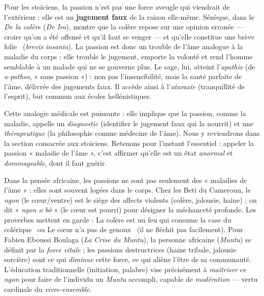 \documentclass[11pt]{article}
\begin{document}
\begin{propriete}
Pour les stoïciens, la passion n'est pas une force aveugle qui viendrait de l'extérieur : elle est un \textbf{jugement faux} de la raison elle-même. Sénèque, dans le \emph{De la colère} (\emph{De Ira}), montre que la colère repose sur une opinion erronée — croire qu'on a été offensé et qu'il faut se venger — et qu'elle constitue une \guillemotleft brève folie \guillemotright\ (\emph{brevis insania}). La passion est donc un trouble de l'âme analogue à la maladie du corps : elle trouble le jugement, emporte la volonté et rend l'homme semblable à un malade qui ne se gouverne plus. Le sage, lui, atteint l'\emph{apathie} (de \emph{a-pathos}, « sans passion ») : non pas l'insensibilité, mais la santé parfaite de l'âme, délivrée des jugements faux. Il accède ainsi à l'\emph{ataraxie} (tranquillité de l'esprit), but commun aux écoles hellénistiques.
\end{propriete}

Cette analogie médicale est puissante : elle implique que la passion, comme la maladie, appelle un \emph{diagnostic} (identifier le jugement faux qui la nourrit) et une \emph{thérapeutique} (la philosophie comme médecine de l'âme). Nous y reviendrons dans la section consacrée aux stoïciens. Retenons pour l'instant l'essentiel : appeler la passion « maladie de l'âme », c'est affirmer qu'elle est un état \emph{anormal} et \emph{dommageable}, dont il faut guérir.

\begin{savaistu}
Dans la pensée africaine, les passions ne sont pas seulement des « maladies de l'âme » : elles sont souvent logées dans le corps. Chez les Beti du Cameroun, le \emph{ngon} (le cœur/ventre) est le siège des affects violents (colère, jalousie, haine) ; on dit « \emph{ngon o bô} » (le cœur est pourri) pour désigner la méchanceté profonde. Les proverbes mettent en garde : \guillemotleft La colère est un feu qui consume la case du colérique \guillemotright\ ou \guillemotleft Le cœur n'a pas de genoux \guillemotright\ (il ne fléchit pas facilement). Pour Fabien Eboussi Boulaga (\emph{La Crise du Muntu}), la personne africaine (\emph{Muntu}) se définit par la \emph{force vitale} ; les passions destructrices (haine tribale, jalousie sorcière) sont ce qui \emph{diminue} cette force, ce qui aliène l'être de sa communauté. L'éducation traditionnelle (initiation, palabre) vise précisément à \emph{maîtriser} ce \emph{ngon} pour faire de l'individu un \emph{Muntu} accompli, capable de \emph{modération} — vertu cardinale du \emph{vivre-ensemble}.
\end{savaistu}
\end{document}
